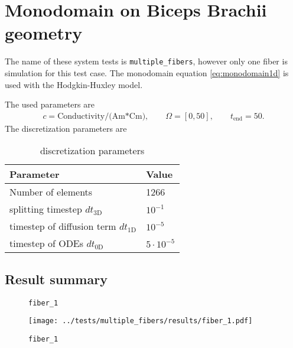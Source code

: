 %
\clearpage
%
\section{Monodomain on Biceps Brachii geometry}
  The name of these system tests is \lstinline{multiple_fibers}, however only one fiber is simulation for this test case.
  The monodomain equation \eqref{eq:monodomain1d} is used with the Hodgkin-Huxley model.
  
  The used parameters are
  \begin{equation*}
    \begin{array}{lll}
      c = \text{Conductivity/(Am*Cm)},\qquad \Omega = [0,50], \qquad t_\text{end}=50.
    \end{array}
  \end{equation*}
  The discretization parameters are
  \begin{table}[h!]
    \begin{center}
      \begin{tabular}{l|l}
        \textbf{Parameter} & \textbf{Value}\\
        \hline
        Number of elements & 1266\\
        splitting timestep $dt_\text{3D}$ & $10^{-1}$\\
        timestep of diffusion term $dt_\text{1D}$ & $10^{-5}$\\
        timestep of ODEs $dt_\text{0D}$ & $5\cdot 10^{-5}$
      \end{tabular}
    \end{center}
    \caption{discretization parameters}
    \label{tab:table_monodomain2}
  \end{table}

\subsection{Result summary}
%
\begin{figure}[h!]
  \caption{\lstinline{fiber_1}}
\end{figure} 
%
\begin{figure}[t]%
  \centering%
  \texttt{[image: ../tests/multiple\_fibers/results/fiber\_1.pdf]}%
  \caption{\lstinline{fiber_1}}
\end{figure}%
%


%
